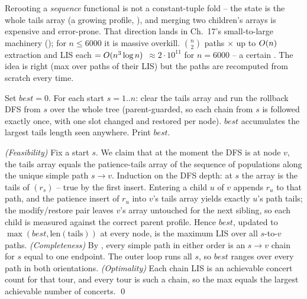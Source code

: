 \begin{thinkbox}
{Rerooting a \emph{sequence} functional is not a constant-tuple fold -- the state is the
whole tails array (a growing profile, ), and merging two children's
arrays is expensive and error-prone. That direction lands in Ch.~17's small-to-large
machinery (); for $n\le6000$ it is massive overkill.}
{$\binom{n}{2}$ paths $\times$ up to $O(n)$ extraction and LIS each $= O(n^3\log n)$
$\approx 2\cdot10^{11}$ for $n=6000$ -- a certain \tle. The idea is right (max over paths of
their LIS) but the paths are recomputed from scratch every time.}
\end{thinkbox}

Set $\mathit{best}=0$. For each start $s=1..n$: clear the tails array and run the
rollback DFS  from $s$ over the whole tree (parent-guarded, so
each chain from $s$ is followed exactly once, with one slot changed and restored per
node). $\mathit{best}$ accumulates the largest tails length seen anywhere. Print
$\mathit{best}$.

\begin{proofbox}
\emph{(Feasibility)} Fix a start $s$. We claim that at the moment the DFS is at node $v$,
the tails array equals the patience-tails array of the sequence of populations along the
unique simple path $s\!\to\!v$. Induction on the DFS depth: at $s$ the array is the tails of
$(r_s)$ -- true by the first insert. Entering a child $u$ of $v$ appends $r_u$ to that path,
and the patience insert of $r_u$ into $v$'s tails array yields exactly $u$'s path tails;
the modify/restore pair leaves $v$'s array untouched for the next sibling, so each child is
measured against the correct parent profile. Hence $\mathit{best}$, updated to
$\max(\mathit{best}, \text{len}(\text{tails}))$ at every node, is the maximum LIS over all
$s$-to-$v$ paths. \emph{(Completeness)} By , every simple path in
either order is an $s\!\to\!v$ chain for $s$ equal to one endpoint. The outer loop runs all
$s$, so $\mathit{best}$ ranges over every path in both orientations. \emph{(Optimality)}
Each chain LIS is an achievable concert count for that tour, and every tour is such a chain,
so the max equals the largest achievable number of concerts. \qed
\end{proofbox}


